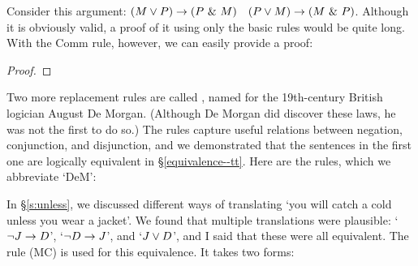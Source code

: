 Consider this argument: $(M \vee P) \rightarrow (P ~\&~ M)$ \therefore\ $(P \vee M) \rightarrow (M ~\&~ P)$. Although it is obviously valid, a proof of it using only the basic rules would be quite long. With the Comm rule, however, we can easily provide a proof:

\begin{proof}
	 
\end{proof}

 %

Two more replacement rules are called , named for the 19th-century British logician August De Morgan. (Although De Morgan did discover these laws, he was not the first to do so.) The rules capture useful relations between negation, conjunction, and disjunction, and we demonstrated that the sentences in the first one are logically equivalent in \S\ref{equivalence--tt}. Here are the rules, which we abbreviate `DeM':

In \S\ref{s:unless}, we discussed different ways of translating `you will catch a cold unless you wear a jacket'. We found that multiple translations were plausible: `${\neg} J \rightarrow D$', `${\neg} D \rightarrow J$', and `$J \vee D$', and I said that these were all equivalent. The  rule (MC) is used for this equivalence. It takes two forms:

